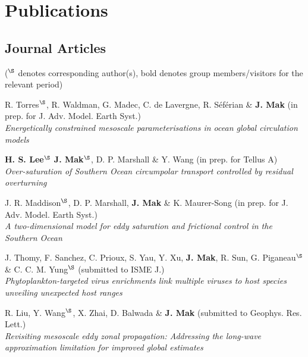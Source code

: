 \documentclass[letterpaper]{article}
\renewenvironment{itemize}{
  \begin{list}{}{
    \setlength{\leftmargin}{1.5em}
  }
}{
  \end{list}
}
\begin{document}
\section*{Publications}
\subsection*{Journal Articles}

(${}^\S$ denotes corresponding author(s), bold denotes group members/visitors for the relevant period)

\begin{itemize}


\item[*] R. Torres$^{\S}$, R. Waldman, G. Madec, C. de Lavergne, R. S\'ef\'erian \& \textbf{J. Mak} (in prep. for J. Adv. Model. Earth Syst.)\\
\textit{Energetically constrained mesoscale parameterisations in ocean global circulation models}

\item[*] \textbf{H. S. Lee}$^{\S}$ \textbf{J. Mak}$^{\S}$, D. P. Marshall \& Y. Wang (in prep. for Tellus A)\\
\textit{Over-saturation of Southern Ocean circumpolar transport controlled by residual overturning}

\item[*] J. R. Maddison$^{\S}$, D. P. Marshall, \textbf{J. Mak} \& K. Maurer-Song (in prep. for J. Adv. Model. Earth Syst.)\\
\textit{A two-dimensional model for eddy saturation and frictional control in the Southern Ocean}

\item[*] J. Thomy, F. Sanchez, C. Prioux, S. Yau, Y. Xu, \textbf{J. Mak}, R. Sun, G. Piganeau$^{\S}$ \& C. C. M. Yung$^{\S}$ (submitted to ISME J.)\\
\textit{Phytoplankton-targeted virus enrichments link multiple viruses to host species unveiling unexpected host ranges}

\item[*] R. Liu, Y. Wang$^{\S}$, X. Zhai, D. Balwada \& \textbf{J. Mak} (submitted to Geophys. Res. Lett.)\\
\textit{Revisiting mesoscale eddy zonal propagation: Addressing the long-wave approximation limitation for improved global estimates}


\end{itemize}
\end{document}
